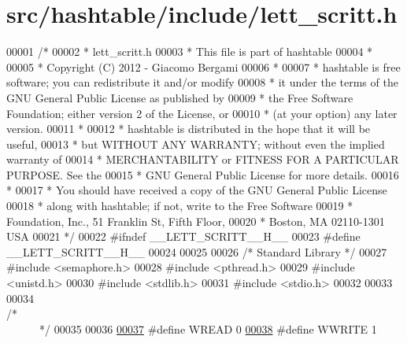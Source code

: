 \hypertarget{lett__scritt_8h_source}{
\section{src/hashtable/include/lett\_\-scritt.h}
}

\begin{DoxyCode}
00001 \textcolor{comment}{/*}
00002 \textcolor{comment}{ * lett\_scritt.h}
00003 \textcolor{comment}{ * This file is part of hashtable}
00004 \textcolor{comment}{ *}
00005 \textcolor{comment}{ * Copyright (C) 2012 - Giacomo Bergami}
00006 \textcolor{comment}{ *}
00007 \textcolor{comment}{ * hashtable is free software; you can redistribute it and/or modify}
00008 \textcolor{comment}{ * it under the terms of the GNU General Public License as published by}
00009 \textcolor{comment}{ * the Free Software Foundation; either version 2 of the License, or}
00010 \textcolor{comment}{ * (at your option) any later version.}
00011 \textcolor{comment}{ *}
00012 \textcolor{comment}{ * hashtable is distributed in the hope that it will be useful,}
00013 \textcolor{comment}{ * but WITHOUT ANY WARRANTY; without even the implied warranty of}
00014 \textcolor{comment}{ * MERCHANTABILITY or FITNESS FOR A PARTICULAR PURPOSE.  See the}
00015 \textcolor{comment}{ * GNU General Public License for more details.}
00016 \textcolor{comment}{ *}
00017 \textcolor{comment}{ * You should have received a copy of the GNU General Public License}
00018 \textcolor{comment}{ * along with hashtable; if not, write to the Free Software}
00019 \textcolor{comment}{ * Foundation, Inc., 51 Franklin St, Fifth Floor, }
00020 \textcolor{comment}{ * Boston, MA  02110-1301  USA}
00021 \textcolor{comment}{ */}
00022 \textcolor{preprocessor}{#ifndef \_\_LETT\_SCRITT\_\_H\_\_}
00023 \textcolor{preprocessor}{}\textcolor{preprocessor}{#define \_\_LETT\_SCRITT\_\_H\_\_}
00024 \textcolor{preprocessor}{}
00025 
00026 \textcolor{comment}{/*      Standard Library        */}
00027 \textcolor{preprocessor}{#include        <semaphore.h>}
00028 \textcolor{preprocessor}{#include        <pthread.h>}
00029 \textcolor{preprocessor}{#include        <unistd.h>}
00030 \textcolor{preprocessor}{#include        <stdlib.h>}
00031 \textcolor{preprocessor}{#include        <stdio.h>}
00032 
00033 
00034 \textcolor{comment}{/*~~~~~~~~~~~~~~~~~~~~~~~~~~~~~~~~~~~~~~~~~~~~~~~~~~~~~~~~~~~~~~~~~~~~~~~~~~~~*/}
00035 
00036 
\hypertarget{lett__scritt_8h_source_l00037}{}\hyperlink{lett__scritt_8h_abb293b5fc19bb8afcd3f45099b1da41f}{00037} \textcolor{preprocessor}{#define WREAD   0}
\hypertarget{lett__scritt_8h_source_l00038}{}\hyperlink{lett__scritt_8h_a114cfcc3174a77912ed503925f0d5c3d}{00038} \textcolor{preprocessor}{}\textcolor{preprocessor}{#define WWRITE  1}

\end{DoxyCode}
